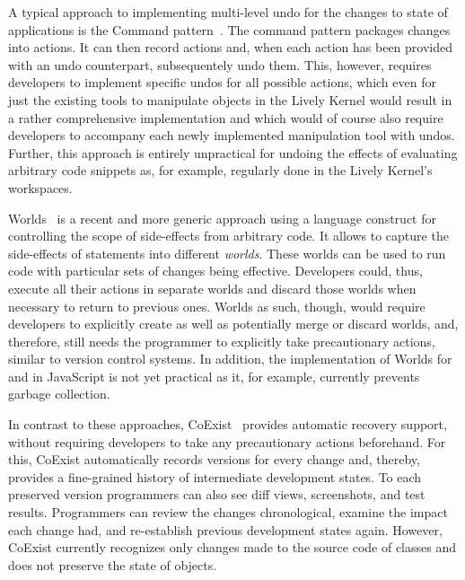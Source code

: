 A typical approach to implementing multi-level undo for the changes to state of applications is the Command pattern~\cite{GammaHelmJohnsonVlissides95}.
The command pattern packages changes into actions.
It can then record actions and, when each action has been provided with an undo counterpart, subsequentely undo them.
This, however, requires developers to implement specific undos for all possible actions, which even for just the existing tools to manipulate objects in the Lively Kernel would result in a rather comprehensive implementation and which would of course also require developers to accompany each newly implemented manipulation tool with undos.  
Further, this approach is entirely unpractical for undoing the effects of evaluating arbitrary code snippets as, for example, regularly done in the Lively Kernel's workspaces.

Worlds~\cite{Warth2011Wor} is a recent and more generic approach using a language construct for controlling the scope of side-effects from arbitrary code.
It allows to capture the side-effects of statements into different \emph{worlds}.
These worlds can be used to run code with particular sets of changes being effective.
Developers could, thus, execute all their actions in separate worlds and discard those worlds when necessary to return to previous ones.
Worlds as such, though, would require developers to explicitly create as well as potentially merge or discard worlds, and, therefore, still needs the programmer to explicitly take precautionary actions, similar to version control systems.
In addition, the implementation of Worlds for and in JavaScript is not yet practical as it, for example, currently prevents garbage collection.

In contrast to these approaches, CoExist~\cite{Steinert2012COE,Steinert2014EVA} provides automatic recovery support, without requiring developers to take any precautionary actions beforehand.
For this, CoExist automatically records versions for every change and, thereby, provides a fine-grained history of intermediate development states.
To each preserved version programmers can also see diff views, screenshots, and test results.
Programmers can review the changes chronological, examine the impact each change had, and re-establish previous development states again.
However, CoExist currently recognizes only changes made to the source code of classes and does not preserve the state of objects.

